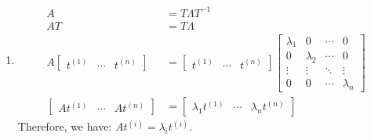 \item 
\begin{enumerate}
    \item \begin{answer}
        \begin{align*}
            A &= T\Lambda T^{-1} \\
            AT &= T\Lambda \\
            A \begin{bmatrix}
                t^{(1)} & \cdots & t^{(n)}
            \end{bmatrix} &= 
            \begin{bmatrix}
                t^{(1)} & \cdots & t^{(n)}
            \end{bmatrix}
            \begin{bmatrix}
                \lambda_1 & 0 & \cdots & 0 \\
                0 & \lambda_2 & \cdots & 0 \\
                \vdots & \vdots & \ddots & \vdots \\
                0 & 0 & \cdots & \lambda_n
            \end{bmatrix} \\
            \begin{bmatrix}
                At^{(1)} & \cdots & At^{(n)}
            \end{bmatrix} &= 
            \begin{bmatrix}
                \lambda_1 t^{(1)} & \cdots & \lambda_n t^{(n)}
            \end{bmatrix}
        \end{align*}
        Therefore, we have: $At^{(i)} = \lambda_i t^{(i)}$.
    \end{answer}


\end{enumerate}
